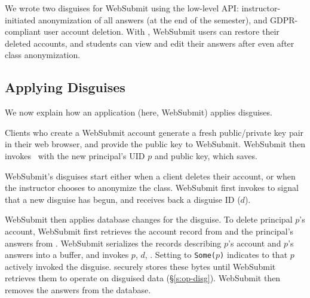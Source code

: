 %
We wrote two disguises for WebSubmit using the low-level API: \one{}
instructor-initiated anonymization of all answers (\eg at the end of the semester),
and \two{} GDPR-compliant user account deletion.
%
%
With \sys, WebSubmit users can restore their deleted accounts, and students can
view and edit their answers after even after class anonymization.
%

\subsection{Applying Disguises}
%
We now explain how an application (here, WebSubmit) applies disguises.
%

%
Clients who create a WebSubmit account generate a fresh public/private key pair
in their web browser, and provide the public key to WebSubmit.
%
WebSubmit then invokes  with the new principal's UID $p$
and public key, which \sys saves.
%

%
WebSubmit's disguises start either when a client deletes their account,
or when the instructor chooses to anonymize the class.
%
WebSubmit first invokes  to signal \sys that a new
disguise has begun, and receives back a disguise ID ($d$).
%

%
WebSubmit then applies database changes for the disguise.
%
To delete principal $p$'s account, WebSubmit first retrieves the account record
from  and the principal's answers from .
%
WebSubmit serializes the records describing $p$'s account and $p$'s answers into a buffer, and
invokes $p$, $d$, .  Setting  to
\texttt{Some($p$)} indicates to \sys that $p$ actively invoked the disguise.
%
\sys securely stores these bytes until WebSubmit retrieves them to operate on
disguised data (\S\ref{s:op-disg}).
%
WebSubmit then removes the answers from the database.
%

